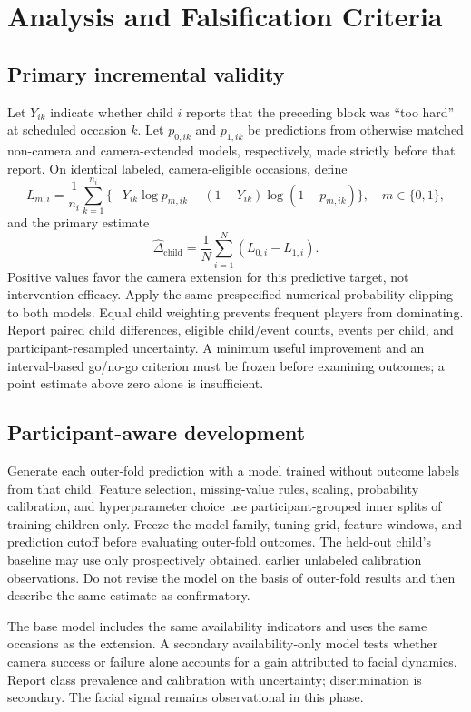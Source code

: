 \section{Analysis and Falsification Criteria}

\subsection{Primary incremental validity}

Let \(Y_{ik}\) indicate whether child \(i\) reports that the preceding block was \enquote{too hard} at scheduled occasion \(k\). Let \(p_{0,ik}\) and \(p_{1,ik}\) be predictions from otherwise matched non-camera and camera-extended models, respectively, made strictly before that report. On identical labeled, camera-eligible occasions, define
\[
L_{m,i}=\frac{1}{n_i}\sum_{k=1}^{n_i}
\{-Y_{ik}\log p_{m,ik}-(1-Y_{ik})\log(1-p_{m,ik})\},
\quad m\in\{0,1\},
\]
and the primary estimate
\[
\widehat{\Delta}_{\mathrm{child}}
=\frac{1}{N}\sum_{i=1}^{N}(L_{0,i}-L_{1,i}).
\]
Positive values favor the camera extension for this predictive target, not intervention efficacy. Apply the same prespecified numerical probability clipping to both models. Equal child weighting prevents frequent players from dominating. Report paired child differences, eligible child/event counts, events per child, and participant-resampled uncertainty. A minimum useful improvement and an interval-based go/no-go criterion must be frozen before examining outcomes; a point estimate above zero alone is insufficient.

\subsection{Participant-aware development}

Generate each outer-fold prediction with a model trained without outcome labels from that child. Feature selection, missing-value rules, scaling, probability calibration, and hyperparameter choice use participant-grouped inner splits of training children only. Freeze the model family, tuning grid, feature windows, and prediction cutoff before evaluating outer-fold outcomes. The held-out child's baseline may use only prospectively obtained, earlier unlabeled calibration observations. Do not revise the model on the basis of outer-fold results and then describe the same estimate as confirmatory.

The base model includes the same availability indicators and uses the same occasions as the extension. A secondary availability-only model tests whether camera success or failure alone accounts for a gain attributed to facial dynamics. Report class prevalence and calibration with uncertainty; discrimination is secondary. The facial signal remains observational in this phase.


